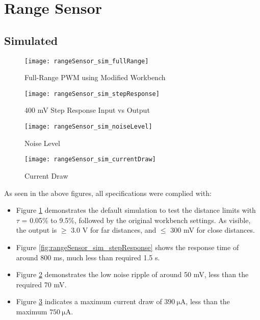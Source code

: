 \graphicspath{{content/3_results/figures}}
\section{Range Sensor}\label{sec:range_sensor_results}

\subsection{Simulated}

\begin{figure}[!htb]
    \centering
    \texttt{[image: rangeSensor\_sim\_fullRange]}
    \caption{Full-Range PWM using Modified Workbench}
    \label{fig:rangeSensor_sim_fullRange}
\end{figure}

\begin{figure}[!h]
    \centering
    \begin{minipage}{0.45\textwidth}
        \centering
        \texttt{[image: rangeSensor\_sim\_stepResponse]}
        \caption{400 mV Step Response Input vs Output}
        \label{fig:rangeSensor_sim_stepResponse}
    \end{minipage}
    \begin{minipage}{0.45\textwidth}
        \centering
        \texttt{[image: rangeSensor\_sim\_noiseLevel]}
        \caption{Noise Level}
        \label{fig:rangeSensor_sim_noiseLevel}
    \end{minipage}
\end{figure}

\begin{figure}[!htb]
    \centering
    \texttt{[image: rangeSensor\_sim\_currentDraw]}
    \caption{Current Draw}
    \label{fig:rangeSensor_sim_currentDraw}
\end{figure}

As seen in the above figures, all specifications were complied with:
\begin{itemize}
    \item Figure \ref{fig:rangeSensor_sim_fullRange} demonstrates the default simulation to test the distance limits with $\tau$ = 0.05\% to 9.5\%,
          followed by the original workbench settings. As visible, the output is $\geq$ 3.0 V for far distances, and $\leq$ 300 mV for close distances.
    \item Figure \ref{fig:rangeSensor_sim_stepResponse} shows the response time of around 800 ms, much less than required 1.5 s.
    \item Figure \ref{fig:rangeSensor_sim_noiseLevel} demonstrates the low noise ripple of around 50 mV, less than the required 70 mV.
    \item Figure \ref{fig:rangeSensor_sim_currentDraw} indicates a maximum current draw of $\SI{390}{\micro\ampere}$, less than the maximum $\SI{750}{\micro\ampere}$.

\end{itemize}

